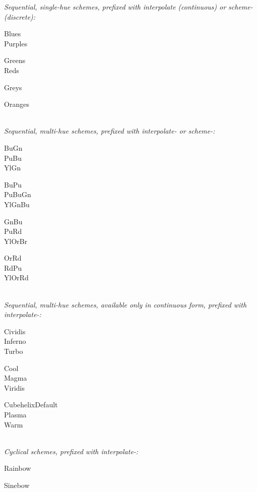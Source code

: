 \textit{Sequential, single-hue schemes, prefixed with interpolate (continuous) or scheme- (discrete):}

{\footnotesize
\begin{minipage}[t]{1.5cm}
    Blues\\
    Purples
\end{minipage}
\begin{minipage}[t]{1.5cm}
    Greens\\
    Reds
\end{minipage}
\begin{minipage}[t]{1.5cm}
    Greys
\end{minipage}
\begin{minipage}[t]{1.5cm}
    Oranges
\end{minipage}
}
\\[1mm]

\textit{Sequential, multi-hue schemes, prefixed with interpolate- or scheme-:}

{\footnotesize
\begin{minipage}[t]{1.5cm}
    BuGn\\
    PuBu\\
    YlGn
\end{minipage}
\begin{minipage}[t]{1.5cm}
    BuPu\\
    PuBuGn\\
    YlGnBu
\end{minipage}
\begin{minipage}[t]{1.5cm}
    GnBu\\
    PuRd\\
    YlOrBr
\end{minipage}
\begin{minipage}[t]{1.5cm}
    OrRd\\
    RdPu\\
    YlOrRd
\end{minipage}
}
\\[1mm]

\textit{Sequential, multi-hue schemes, available only in continuous form, prefixed with interpolate-:}\\
{\footnotesize
\begin{minipage}[t]{2.0cm}
    Cividis\\
    Inferno\\
    Turbo
\end{minipage}
\begin{minipage}[t]{2.0cm}
    Cool\\
    Magma\\
    Viridis
\end{minipage}
\begin{minipage}[t]{2.0cm}
    CubehelixDefault\\
    Plasma\\
    Warm
\end{minipage}
}
\\[1mm]


\textit{Cyclical schemes, prefixed with interpolate-:}

{\footnotesize
\begin{minipage}[t]{3.0cm}
    Rainbow
\end{minipage}
\begin{minipage}[t]{3.0cm}
    Sinebow
\end{minipage}
}

